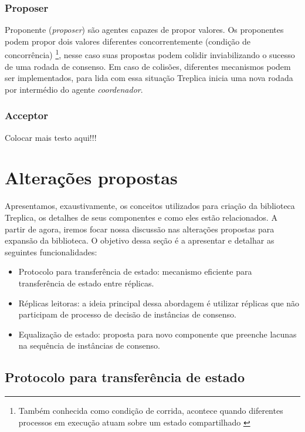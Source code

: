 \subsubsection{Proposer}

Proponente (\emph{proposer}) são agentes capazes de propor valores. Os proponentes podem
propor dois valores diferentes concorrentemente (condição de concorrência)
\footnote{Também conhecida como condição de corrida, acontece quando diferentes processos
em execução atuam sobre um estado compartilhado \cite{alguem}}, nesse caso suas propostas
podem colidir inviabilizando o sucesso de uma rodada de consenso. Em caso de colisões,
diferentes mecanismos podem ser implementados, para lida com essa situação Treplica inicia
uma nova rodada por intermédio do agente \emph{coordenador}.

\subsubsection{Acceptor}

Colocar mais testo aqui!!!


\section{Alterações propostas}

Apresentamos, exaustivamente, os conceitos utilizados para criação da biblioteca Treplica,
os detalhes de seus componentes e como eles estão relacionados. A partir de agora, iremos
focar nossa discussão nas alterações propostas para expansão da biblioteca. O objetivo
dessa seção é a apresentar e detalhar as seguintes funcionalidades:

\begin{itemize}
  \item Protocolo para transferência de estado: mecanismo eficiente para transferência de
    estado entre réplicas.
  \item Réplicas leitoras: a ideia principal dessa abordagem é utilizar réplicas que não
    participam de processo de decisão de instâncias de consenso.
  \item Equalização de estado: proposta para novo componente que preenche lacunas na
    sequência de instâncias de consenso.
\end{itemize}

\subsection{Protocolo para transferência de estado}

